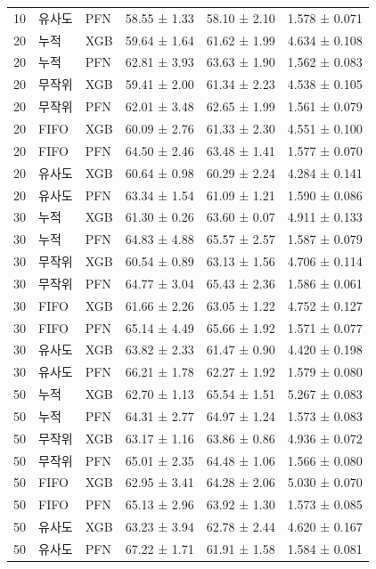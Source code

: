 \begin{longtable}
{}10 & 유사도 & PFN & 58.55 ± 1.33 & 58.10 ± 2.10 & 1.578 ± 0.071 \\
{}20 & 누적 & XGB & 59.64 ± 1.64 & 61.62 ± 1.99 & 4.634 ± 0.108 \\
{}20 & 누적 & PFN & 62.81 ± 3.93 & 63.63 ± 1.90 & 1.562 ± 0.083 \\
{}20 & 무작위 & XGB & 59.41 ± 2.00 & 61.34 ± 2.23 & 4.538 ± 0.105 \\
{}20 & 무작위 & PFN & 62.01 ± 3.48 & 62.65 ± 1.99 & 1.561 ± 0.079 \\
{}20 & FIFO & XGB & 60.09 ± 2.76 & 61.33 ± 2.30 & 4.551 ± 0.100 \\
{}20 & FIFO & PFN & 64.50 ± 2.46 & 63.48 ± 1.41 & 1.577 ± 0.070 \\
{}20 & 유사도 & XGB & 60.64 ± 0.98 & 60.29 ± 2.24 & 4.284 ± 0.141 \\
{}20 & 유사도 & PFN & 63.34 ± 1.54 & 61.09 ± 1.21 & 1.590 ± 0.086 \\
{}30 & 누적 & XGB & 61.30 ± 0.26 & 63.60 ± 0.07 & 4.911 ± 0.133 \\
{}30 & 누적 & PFN & 64.83 ± 4.88 & 65.57 ± 2.57 & 1.587 ± 0.079 \\
{}30 & 무작위 & XGB & 60.54 ± 0.89 & 63.13 ± 1.56 & 4.706 ± 0.114 \\
{}30 & 무작위 & PFN & 64.77 ± 3.04 & 65.43 ± 2.36 & 1.586 ± 0.061 \\
{}30 & FIFO & XGB & 61.66 ± 2.26 & 63.05 ± 1.22 & 4.752 ± 0.127 \\
{}30 & FIFO & PFN & 65.14 ± 4.49 & 65.66 ± 1.92 & 1.571 ± 0.077 \\
{}30 & 유사도 & XGB & 63.82 ± 2.33 & 61.47 ± 0.90 & 4.420 ± 0.198 \\
{}30 & 유사도 & PFN & 66.21 ± 1.78 & 62.27 ± 1.92 & 1.579 ± 0.080 \\
{}50 & 누적 & XGB & 62.70 ± 1.13 & 65.54 ± 1.51 & 5.267 ± 0.083 \\
{}50 & 누적 & PFN & 64.31 ± 2.77 & 64.97 ± 1.24 & 1.573 ± 0.083 \\
{}50 & 무작위 & XGB & 63.17 ± 1.16 & 63.86 ± 0.86 & 4.936 ± 0.072 \\
{}50 & 무작위 & PFN & 65.01 ± 2.35 & 64.48 ± 1.06 & 1.566 ± 0.080 \\
{}50 & FIFO & XGB & 62.95 ± 3.41 & 64.28 ± 2.06 & 5.030 ± 0.070 \\
{}50 & FIFO & PFN & 65.13 ± 2.96 & 63.92 ± 1.30 & 1.573 ± 0.085 \\
{}50 & 유사도 & XGB & 63.23 ± 3.94 & 62.78 ± 2.44 & 4.620 ± 0.167 \\
{}50 & 유사도 & PFN & 67.22 ± 1.71 & 61.91 ± 1.58 & 1.584 ± 0.081 \\

\end{longtable}
